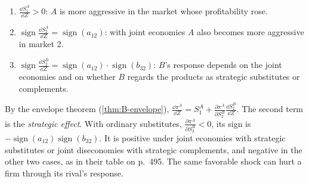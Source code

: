 \begin{example}
\begin{enumerate}[label=(\arabic*)]
  \item $\frac{\dd S_1^A}{\dd Z} > 0$: $A$ is more aggressive in the market whose profitability rose.
  \item $\operatorname{sign}\frac{\dd S_2^A}{\dd Z} = \operatorname{sign}(a_{12})$: with joint economies $A$ also becomes more
  aggressive in market 2.
  \item $\operatorname{sign}\frac{\dd S_2^B}{\dd Z} = \operatorname{sign}(a_{12})\cdot\operatorname{sign}(b_{32})$: $B$'s response depends on the
  joint economies and on whether $B$ regards the products as strategic substitutes or complements.
\end{enumerate}
By the envelope theorem (\cref{thm:B-envelope}), $\frac{\dd\pi^A}{\dd Z} = S_1^A + \frac{\partial\pi^A}{\partial S_2^B}\frac{\dd S_2^B}{\dd Z}$.
The second term is the \emph{strategic effect}. With ordinary substitutes, $\frac{\partial\pi^A}{\partial S_2^B} < 0$, its sign is
$-\operatorname{sign}(a_{12})\operatorname{sign}(b_{32})$. It is positive under joint economies with strategic substitutes or joint
diseconomies with strategic complements, and negative in the other two cases, as in their table on p.~495.
The same favorable shock can hurt a firm through its rival's response.
\end{example}

